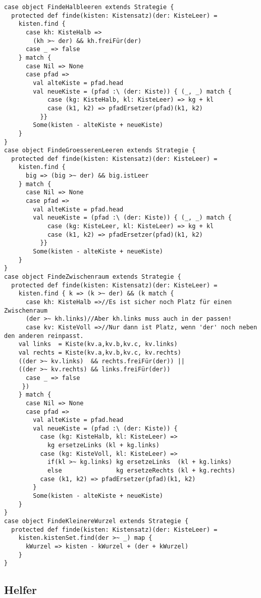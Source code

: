 \begin{lstlisting}
case object FindeHalbleeren extends Strategie {
  protected def finde(kisten: Kistensatz)(der: KisteLeer) =
    kisten.find {
      case kh: KisteHalb =>
        (kh >~ der) && kh.freiFür(der)
      case _ => false
    } match {
      case Nil => None
      case pfad =>
        val alteKiste = pfad.head
        val neueKiste = (pfad :\ (der: Kiste)) { (_, _) match {
            case (kg: KisteHalb, kl: KisteLeer) => kg + kl
            case (k1, k2) => pfadErsetzer(pfad)(k1, k2)
          }}
        Some(kisten - alteKiste + neueKiste)
    }
}
case object FindeGroesserenLeeren extends Strategie {
  protected def finde(kisten: Kistensatz)(der: KisteLeer) =
    kisten.find {
      big => (big >~ der) && big.istLeer
    } match {
      case Nil => None
      case pfad =>
        val alteKiste = pfad.head
        val neueKiste = (pfad :\ (der: Kiste)) { (_, _) match {
            case (kg: KisteLeer, kl: KisteLeer) => kg + kl
            case (k1, k2) => pfadErsetzer(pfad)(k1, k2)
          }}
        Some(kisten - alteKiste + neueKiste)
    }
}
case object FindeZwischenraum extends Strategie {
  protected def finde(kisten: Kistensatz)(der: KisteLeer) =
    kisten.find { k => (k >~ der) && (k match {
      case kh: KisteHalb =>//Es ist sicher noch Platz für einen Zwischenraum
	  (der >~ kh.links)//Aber kh.links muss auch in der passen!
      case kv: KisteVoll =>//Nur dann ist Platz, wenn 'der' noch neben den anderen reinpasst.
	val links  = Kiste(kv.a,kv.b,kv.c, kv.links)
	val rechts = Kiste(kv.a,kv.b,kv.c, kv.rechts)
	((der >~ kv.links)  && rechts.freiFür(der)) ||
	((der >~ kv.rechts) && links.freiFür(der))
      case _ => false
     })
    } match {
      case Nil => None
      case pfad =>
        val alteKiste = pfad.head
        val neueKiste = (pfad :\ (der: Kiste)) {
          case (kg: KisteHalb, kl: KisteLeer) =>
            kg ersetzeLinks (kl + kg.links)
          case (kg: KisteVoll, kl: KisteLeer) =>
            if(kl >~ kg.links) kg ersetzeLinks  (kl + kg.links)
            else               kg ersetzeRechts (kl + kg.rechts)
          case (k1, k2) => pfadErsetzer(pfad)(k1, k2)
        }
        Some(kisten - alteKiste + neueKiste)
    }
}
case object FindeKleinereWurzel extends Strategie {
  protected def finde(kisten: Kistensatz)(der: KisteLeer) =
    kisten.kistenSet.find(der >~ _) map {
      kWurzel => kisten - kWurzel + (der + kWurzel)
    }
}
\end{lstlisting}

\clearpage
\subsection{Helfer}
